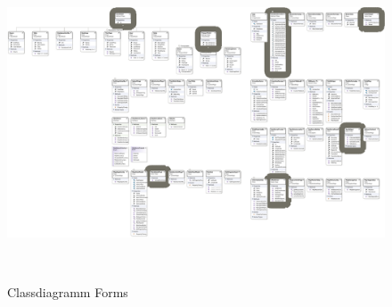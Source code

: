 \documentclass[12pt]{article}
\begin{document}
  \begin{figure}

  	\centering
  	\includegraphics[width=\paperwidth, keepaspectratio=true]{ClassDiagramForms.pdf}
  	\caption{Classdiagramm Forms}\label{classdiagram}\
  \end{figure}
\end{document}

